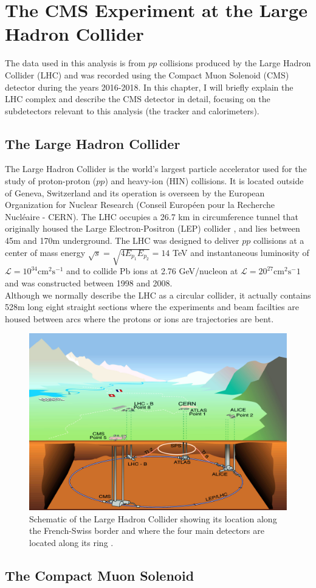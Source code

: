 \chapter{The CMS Experiment at the Large Hadron Collider}\label{chap:cms}
The data used in this analysis is from $pp$ collisions produced by the Large Hadron Collider (LHC) and was recorded using the Compact Muon Solenoid (CMS) detector during the years 2016-2018. In this chapter, I will briefly explain the LHC complex and describe the CMS detector in detail, focusing on the subdetectors relevant to this analysis (the tracker and calorimeters).
\section{The Large Hadron Collider}
The Large Hadron Collider is the world's largest particle accelerator used for the study of proton-proton ($pp$) and heavy-ion (HIN) collisions. It is located outside of Geneva, Switzerland and its operation is overseen by the European Organization for Nuclear Research (Conseil Européen pour la Recherche Nucléaire - CERN). The LHC occupies a 26.7 km in circumference tunnel that originally housed the Large Electron-Positron (LEP) collider \cite{LEP}, and lies between 45m and 170m underground. The LHC was designed to deliver $pp$ collisions at a center of mass energy $\sqrt{s} = \sqrt{4E_{p_1}E_{p_2}}=14$ TeV and instantaneous luminosity of $\mathcal{L} = 10^{34}\mathrm{cm}^2\mathrm{s}^{-1}$ and to collide Pb ions at 2.76 GeV/nucleon at $\mathcal{L}=20^{27}\mathrm{cm}^2\mathrm{s}^-1$ and was constructed between 1998 and 2008.\\
Although we normally describe the LHC as a circular collider, it actually contains 528m long eight straight sections where the experiments and beam facilties are housed between arcs where the protons or ions are trajectories are bent.
\begin{figure}
    \centering
    \includegraphics[width=\linewidth]{figures/LHC-PHO-1997-237.jpg}
    \caption{Schematic of the Large Hadron Collider showing its location along the French-Swiss border and where the four main detectors are located along its ring \cite{LHCMap}. }
    \label{fig:LHCmap}
\end{figure}



\section{The Compact Muon Solenoid}